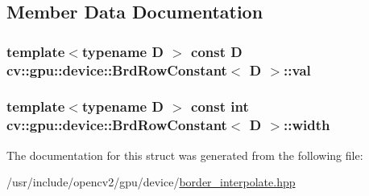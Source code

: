 \subsection{Member Data Documentation}
\hypertarget{structcv_1_1gpu_1_1device_1_1BrdRowConstant_aa88308d16ea260408a472e59c391f95c}{
\subsubsection[{val}]{\setlength{\rightskip}{0pt plus 5cm}template$<$typename D $>$ const D {\bf cv\-::gpu\-::device\-::\-Brd\-Row\-Constant}$<$ D $>$\-::val}}\label{structcv_1_1gpu_1_1device_1_1BrdRowConstant_aa88308d16ea260408a472e59c391f95c}
\hypertarget{structcv_1_1gpu_1_1device_1_1BrdRowConstant_af3ea5f4b679d7f77e216d352c33e9a01}{
\subsubsection[{width}]{\setlength{\rightskip}{0pt plus 5cm}template$<$typename D $>$ const int {\bf cv\-::gpu\-::device\-::\-Brd\-Row\-Constant}$<$ D $>$\-::width}}\label{structcv_1_1gpu_1_1device_1_1BrdRowConstant_af3ea5f4b679d7f77e216d352c33e9a01}


The documentation for this struct was generated from the following file\-:\begin{DoxyCompactItemize}
\item 
/usr/include/opencv2/gpu/device/\hyperlink{border__interpolate_8hpp}{border\-\_\-interpolate.\-hpp}\end{DoxyCompactItemize}
